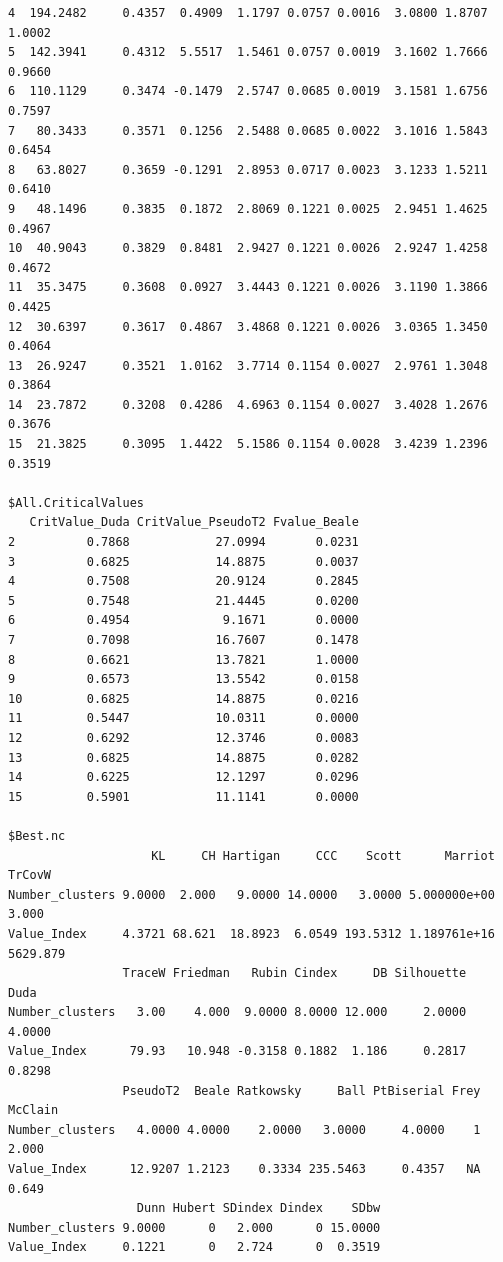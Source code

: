 \documentclass[
]{article}
\begin{document}
\begin{verbatim}
4  194.2482     0.4357  0.4909  1.1797 0.0757 0.0016  3.0800 1.8707 1.0002
5  142.3941     0.4312  5.5517  1.5461 0.0757 0.0019  3.1602 1.7666 0.9660
6  110.1129     0.3474 -0.1479  2.5747 0.0685 0.0019  3.1581 1.6756 0.7597
7   80.3433     0.3571  0.1256  2.5488 0.0685 0.0022  3.1016 1.5843 0.6454
8   63.8027     0.3659 -0.1291  2.8953 0.0717 0.0023  3.1233 1.5211 0.6410
9   48.1496     0.3835  0.1872  2.8069 0.1221 0.0025  2.9451 1.4625 0.4967
10  40.9043     0.3829  0.8481  2.9427 0.1221 0.0026  2.9247 1.4258 0.4672
11  35.3475     0.3608  0.0927  3.4443 0.1221 0.0026  3.1190 1.3866 0.4425
12  30.6397     0.3617  0.4867  3.4868 0.1221 0.0026  3.0365 1.3450 0.4064
13  26.9247     0.3521  1.0162  3.7714 0.1154 0.0027  2.9761 1.3048 0.3864
14  23.7872     0.3208  0.4286  4.6963 0.1154 0.0027  3.4028 1.2676 0.3676
15  21.3825     0.3095  1.4422  5.1586 0.1154 0.0028  3.4239 1.2396 0.3519

$All.CriticalValues
   CritValue_Duda CritValue_PseudoT2 Fvalue_Beale
2          0.7868            27.0994       0.0231
3          0.6825            14.8875       0.0037
4          0.7508            20.9124       0.2845
5          0.7548            21.4445       0.0200
6          0.4954             9.1671       0.0000
7          0.7098            16.7607       0.1478
8          0.6621            13.7821       1.0000
9          0.6573            13.5542       0.0158
10         0.6825            14.8875       0.0216
11         0.5447            10.0311       0.0000
12         0.6292            12.3746       0.0083
13         0.6825            14.8875       0.0282
14         0.6225            12.1297       0.0296
15         0.5901            11.1141       0.0000

$Best.nc
                    KL     CH Hartigan     CCC    Scott      Marriot   TrCovW
Number_clusters 9.0000  2.000   9.0000 14.0000   3.0000 5.000000e+00    3.000
Value_Index     4.3721 68.621  18.8923  6.0549 193.5312 1.189761e+16 5629.879
                TraceW Friedman   Rubin Cindex     DB Silhouette   Duda
Number_clusters   3.00    4.000  9.0000 8.0000 12.000     2.0000 4.0000
Value_Index      79.93   10.948 -0.3158 0.1882  1.186     0.2817 0.8298
                PseudoT2  Beale Ratkowsky     Ball PtBiserial Frey McClain
Number_clusters   4.0000 4.0000    2.0000   3.0000     4.0000    1   2.000
Value_Index      12.9207 1.2123    0.3334 235.5463     0.4357   NA   0.649
                  Dunn Hubert SDindex Dindex    SDbw
Number_clusters 9.0000      0   2.000      0 15.0000
Value_Index     0.1221      0   2.724      0  0.3519


\end{verbatim}
\end{document}
